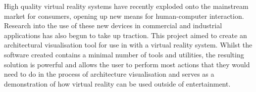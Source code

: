 High quality virtual reality systems have recently exploded onto the mainstream market for consumers, opening up new means for human-computer interaction. Research into the use of these new devices in commercial and industrial applications has also begun to take up traction. This project aimed to create an architectural visualisation tool for use in with a virtual reality system. Whilst the software created contains a minimal number of tools and utilities, the resulting solution is powerful and allows the user to perform most actions that they would need to do in the process of architecture visualisation and serves as a demonstration of how virtual reality can be used outside of entertainment.